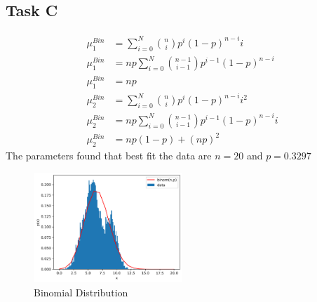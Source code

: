 \subsection*{Task C}
\begin{align*}
	\mu_1^{Bin} & = \sum_{i=0}^{N} \binom{n}{i}p^i(1-p)^{n-i} i            \\
	\mu_1^{Bin} & = np \sum_{i=0}^{N} \binom{n-1}{i-1}p^{i-1}(1-p)^{n-i}   \\
	\mu_1^{Bin} & = np                                                     \\
	\mu_2^{Bin} & = \sum_{i=0}^{N} \binom{n}{i}p^i(1-p)^{n-i} i^2          \\
	\mu_2^{Bin} & = np \sum_{i=0}^{N} \binom{n-1}{i-1}p^{i-1}(1-p)^{n-i} i \\
	\mu_2^{Bin} & = np(1-p) + (np)^2
\end{align*}
The parameters found that best fit the data are $n = 20$ and $p = 0.3297$
\begin{figure}
	\centering
	\includegraphics[width=0.5\textwidth]{images/3c.png}
	\caption{Binomial Distribution}
\end{figure}
